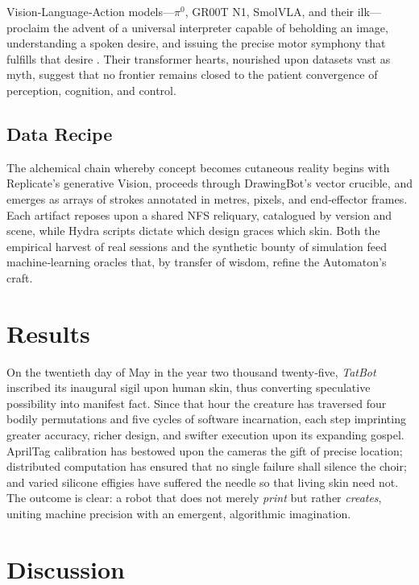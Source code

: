 \documentclass[11pt]{article}
\begin{document}
Vision‑Language‑Action models—$\pi^0$, GR00T N1, SmolVLA, and their ilk—proclaim the advent of a universal interpreter capable of beholding an image, understanding a spoken desire, and issuing the precise motor symphony that fulfills that desire \cite{Black2024pi0,Bjorck2025gr00t,Shukor2025smolvla}.  
Their transformer hearts, nourished upon datasets vast as myth, suggest that no frontier remains closed to the patient convergence of perception, cognition, and control.

\subsection{Data Recipe}

The alchemical chain whereby concept becomes cutaneous reality begins with Replicate’s generative Vision, proceeds through DrawingBot’s vector crucible, and emerges as arrays of strokes annotated in metres, pixels, and end‑effector frames.  
Each artifact reposes upon a shared NFS reliquary, catalogued by version and scene, while Hydra scripts dictate which design graces which skin.  
Both the empirical harvest of real sessions and the synthetic bounty of simulation feed machine‑learning oracles that, by transfer of wisdom, refine the Automaton’s craft.

\section{Results}

On the twentieth day of May in the year two thousand twenty‑five, \emph{TatBot} inscribed its inaugural sigil upon human skin, thus converting speculative possibility into manifest fact.  
Since that hour the creature has traversed four bodily permutations and five cycles of software incarnation, each step imprinting greater accuracy, richer design, and swifter execution upon its expanding gospel.  
AprilTag calibration has bestowed upon the cameras the gift of precise location; distributed computation has ensured that no single failure shall silence the choir; and varied silicone effigies have suffered the needle so that living skin need not.  
The outcome is clear: a robot that does not merely \emph{print} but rather \emph{creates}, uniting machine precision with an emergent, algorithmic imagination.

\section{Discussion}
\end{document}
